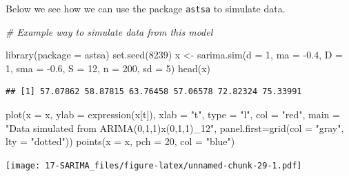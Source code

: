 \documentclass[
]{book}
\newenvironment{Shaded}{\begin{snugshade}}{\end{snugshade}}
\newcommand{\AttributeTok}[1]{\textcolor[rgb]{0.77,0.63,0.00}{#1}}
\newcommand{\CommentTok}[1]{\textcolor[rgb]{0.56,0.35,0.01}{\textit{#1}}}
\newcommand{\DecValTok}[1]{\textcolor[rgb]{0.00,0.00,0.81}{#1}}
\newcommand{\FloatTok}[1]{\textcolor[rgb]{0.00,0.00,0.81}{#1}}
\newcommand{\FunctionTok}[1]{\textcolor[rgb]{0.00,0.00,0.00}{#1}}
\newcommand{\NormalTok}[1]{#1}
\newcommand{\OtherTok}[1]{\textcolor[rgb]{0.56,0.35,0.01}{#1}}
\newcommand{\SpecialCharTok}[1]{\textcolor[rgb]{0.00,0.00,0.00}{#1}}
\newcommand{\StringTok}[1]{\textcolor[rgb]{0.31,0.60,0.02}{#1}}
\theoremstyle{definition}
\theoremstyle{definition}
\theoremstyle{definition}
\theoremstyle{definition}
\theoremstyle{remark}
\begin{document}
Below we see how we can use the package \texttt{astsa} to simulate data.

\begin{Shaded}
\begin{Highlighting}[]
\CommentTok{\# Example way to simulate data from this model}

\FunctionTok{library}\NormalTok{(}\AttributeTok{package =}\NormalTok{ astsa)}
\FunctionTok{set.seed}\NormalTok{(}\DecValTok{8239}\NormalTok{)}
\NormalTok{  x }\OtherTok{\textless{}{-}} \FunctionTok{sarima.sim}\NormalTok{(}\AttributeTok{d =} \DecValTok{1}\NormalTok{, }\AttributeTok{ma =} \SpecialCharTok{{-}}\FloatTok{0.4}\NormalTok{, }\AttributeTok{D =} \DecValTok{1}\NormalTok{, }\AttributeTok{sma =} \SpecialCharTok{{-}}\FloatTok{0.6}\NormalTok{, }\AttributeTok{S =} \DecValTok{12}\NormalTok{, }\AttributeTok{n =} \DecValTok{200}\NormalTok{, }\AttributeTok{sd =} \DecValTok{5}\NormalTok{)}
  \FunctionTok{head}\NormalTok{(x)}
\end{Highlighting}
\end{Shaded}

\begin{verbatim}
## [1] 57.07862 58.87815 63.76458 57.06578 72.82324 75.33991
\end{verbatim}

\begin{Shaded}
\begin{Highlighting}[]
  \FunctionTok{plot}\NormalTok{(}\AttributeTok{x =}\NormalTok{ x, }\AttributeTok{ylab =} \FunctionTok{expression}\NormalTok{(x[t]), }\AttributeTok{xlab =} \StringTok{"t"}\NormalTok{, }\AttributeTok{type =} \StringTok{"l"}\NormalTok{, }\AttributeTok{col =} \StringTok{"red"}\NormalTok{,}
    \AttributeTok{main =}  \StringTok{"Data simulated from ARIMA(0,1,1)x(0,1,1)\_12"}\NormalTok{,}
    \AttributeTok{panel.first=}\FunctionTok{grid}\NormalTok{(}\AttributeTok{col =} \StringTok{"gray"}\NormalTok{, }\AttributeTok{lty =} \StringTok{"dotted"}\NormalTok{))}
  \FunctionTok{points}\NormalTok{(}\AttributeTok{x =}\NormalTok{ x, }\AttributeTok{pch =} \DecValTok{20}\NormalTok{, }\AttributeTok{col =} \StringTok{"blue"}\NormalTok{)}
\end{Highlighting}
\end{Shaded}

\texttt{[image: 17-SARIMA\_files/figure-latex/unnamed-chunk-29-1.pdf]}
\end{document}
